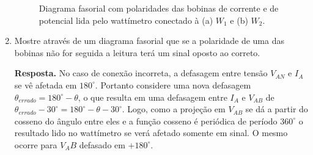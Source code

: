 \documentclass[a4paper,12pt,oneside,openany,table,xcdraw]{article}
\begin{document}
\begin{enumerate}[1)]
\begin{figure}[H]
\centering
{}\hfill
{}
\caption{Diagrama fasorial com polaridades das bobinas de corrente e de potencial lida pelo wattímetro conectado à (a) $W_1$ e (b) $W_2$.}
\label{fasor:w}
\end{figure}

\item  Mostre através de um diagrama fasorial que se a polaridade de uma das bobinas não for seguida a leitura terá um sinal oposto ao correto.  \vspace{0.8mm}

\textbf{Resposta.} No caso de conexão incorreta, a defasagem entre tensão $V_{AN}$ e $I_A$ se vê afetada em $180^\circ$. Portanto considere uma nova defasagem $\theta_{errado} = 180^\circ - \theta$, o que resulta em uma defasagem entre $I_A$ e $V_{AB}$ de $\theta_{errado}-30^\circ = 180^\circ - \theta-30^\circ$. Logo, como a projeção em $V_{AB}$ se dá a partir do cosseno do ângulo entre eles e a função cosseno é periódica de período $360^\circ$ o resultado lido no wattímetro se verá afetado somente em sinal. O mesmo ocorre para $V_AB$ defasado em $+180^\circ$.


\end{enumerate}
\end{document}
